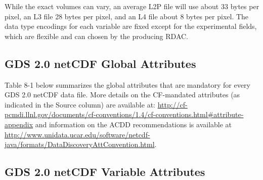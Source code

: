 While the exact volumes can vary, an average L2P file will use about 33 bytes per pixel, an L3 file 28
bytes per pixel, and an L4 file about 8 bytes per pixel. The data type encodings for each variable are
fixed except for the experimental fields, which are flexible and can chosen by the producing RDAC. \par \vspace{0.1in}

\subsection{GDS 2.0 netCDF Global Attributes}
Table 8-1 below summarizes the global attributes that are mandatory for every GDS 2.0 netCDF data
file. More details on the CF-mandated attributes (as indicated in the Source column) are available at:
\url{http://cf-pcmdi.llnl.gov/documents/cf-conventions/1.4/cf-conventions.html#attribute-appendix} and
information on the ACDD recommendations is available at
\url{http://www.unidata.ucar.edu/software/netcdf-java/formats/DataDiscoveryAttConvention.html}.
\par \vspace{0.1in}



\subsection{GDS 2.0 netCDF Variable Attributes}


